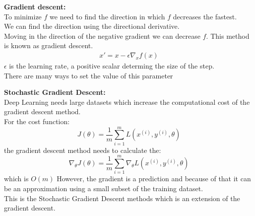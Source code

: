 \documentclass[10pt, compress]{beamer}
\begin{document}
\begin{frame}
  \textbf{Gradient descent:}\\
  To minimize $f$ we need to find the direction in which $f$ decreases the fastest.\\
  We can find the direction using the directional derivative. \\
  Moving in the direction of the negative gradient we can decrease $f$.
  This method is known as gradient descent.\\
  \begin{eqnarray}
    x' = x - \epsilon \nabla_xf(x)
    \nonumber
  \end{eqnarray}
  $\epsilon$ is the learning rate, a positive scalar determing the size of the step.\\
  There are many ways to set the value of this parameter\\


\end{frame}

\begin{frame}
  \vspace{.5cm}
  \textbf{Stochastic Gradient Descent:}\\
  Deep Learning needs large datasets which increase the computational cost of the gradient descent method.\\
  For the cost function:
  \begin{equation}
    J(\theta) = \frac{1}{m}\sum_{i=1}^{m} L(x^{(i)}, y^{(i)},\theta)
    \nonumber
  \end{equation}
  the gradient descent method needs to calculate the:
  \begin{equation}
    \nabla_\theta J(\theta) = \frac{1}{m}\sum_{i=1}^{m} \nabla_\theta L(x^{(i)}, y^{(i)},\theta)
    \nonumber
  \end{equation}
  which is $O(m)$
  However, the gradient is a prediction and because of that it can be an approximation using a small subset of the training dataset.\\
  This is the Stochastic Gradient Descent methods which is an extension of the gradient descent.
\end{frame}
\end{document}
